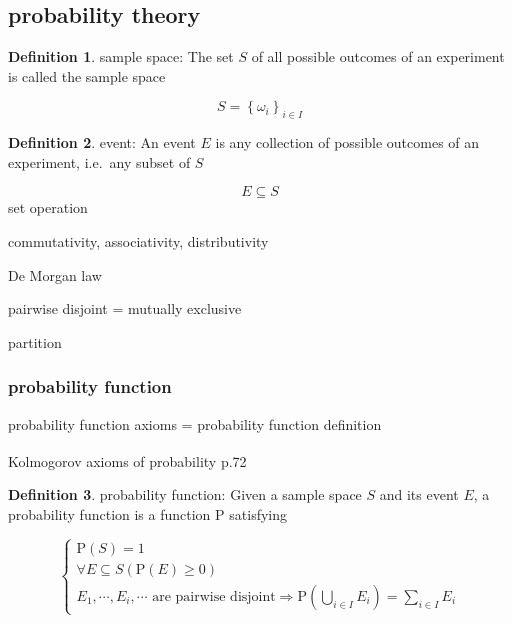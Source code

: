 \documentclass[
]{book}
\theoremstyle{definition}
\newtheorem{definition}{Definition}[chapter]
\theoremstyle{definition}
\theoremstyle{definition}
\theoremstyle{definition}
\theoremstyle{remark}
\begin{document}
\subsection{probability theory}\label{probability-theory}

\begin{definition}
\protect\hypertarget{def:unnamed-chunk-2}{}\label{def:unnamed-chunk-2}sample space: The set \(S\) of all possible outcomes of an experiment is called the sample space
\end{definition}

\[
S=\left\{ \omega_{{\scriptscriptstyle i}}\right\} _{{\scriptscriptstyle i}\in I}
\]

\begin{definition}
\protect\hypertarget{def:unnamed-chunk-3}{}\label{def:unnamed-chunk-3}event: An event \(E\) is any collection of possible outcomes of an experiment, i.e.~any subset of \(S\)
\end{definition}

\[
E \subseteq S
\]
set operation

commutativity, associativity, distributivity

De Morgan law

pairwise disjoint = mutually exclusive

partition

\subsubsection{probability function}\label{probability-function}

probability function axioms = probability function definition

Kolmogorov axioms of probability\textsuperscript{} p.72

\begin{definition}
\protect\hypertarget{def:unnamed-chunk-4}{}\label{def:unnamed-chunk-4}probability function: Given a sample space \(S\) and its event \(E\), a probability function is a function \(\mathrm{P}\) satisfying
\end{definition}

\[
\begin{cases}
\mathrm{P}\left(S\right)=1\\
\forall E\subseteq S\left(\mathrm{P}\left(E\right)\ge0\right)\\
E_{{\scriptscriptstyle 1}},\cdots,E_{{\scriptscriptstyle i}},\cdots\text{ are pairwise disjoint}\Rightarrow\mathrm{P}\left(\bigcup\limits _{i\in I}E_{{\scriptscriptstyle i}}\right)=\sum\limits _{i\in I}E_{{\scriptscriptstyle i}}
\end{cases}
\]
\end{document}
